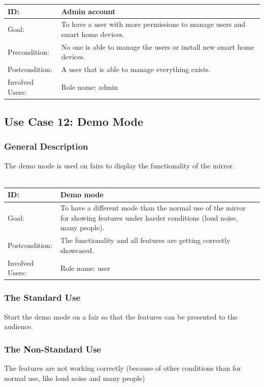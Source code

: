 \documentclass[12pt]{article}
\theoremstyle{definition}
\begin{document}
\begin{tabular}{|p{.2\linewidth}|p{.65\linewidth}|}
\hline 
ID: & Admin account\\ \hline
Goal: & To have a user with more permissions to manage users and smart home devices.\\ \hline
Precondition: & No one is able to manage the users or install new smart home devices.\\ \hline
Postcondition: & A user that is able to manage everything exists. \\ \hline
Involved Users: & Role name: admin \\ \hline
\end{tabular}


\subsection{Use Case 12: Demo Mode}
\subsubsection{General Description}
The demo mode is used on fairs to display the functionality of the mirror. \\
\\
\begin{tabular}{|p{.2\linewidth}|p{.65\linewidth}|}
\hline 
ID: & Demo mode\\ \hline
Goal: & To have a different mode than the normal use of the mirror for showing features under harder conditions (loud noise, many people).\\ \hline
Postcondition: &  The functionality and all features are getting correctly showcased.\\ \hline
Involved Users: & Role name: user \\ \hline
\end{tabular}

\subsubsection{The Standard Use}
Start the demo mode on a fair so that the features can be presented to the audience.

\subsubsection{The Non-Standard Use}
The features are not working correctly (because of other conditions than for normal use, like loud noise and many people)
\end{document}
